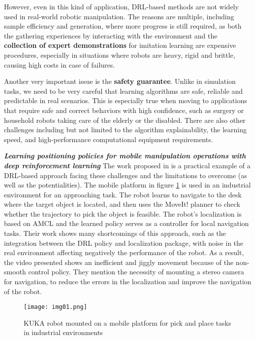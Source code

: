 However, even in this kind of application, DRL-based methods are not widely
used in real-world robotic manipulation. The reasons are multiple, including sample efficiency and generation,
where more progress is still required, as both the gathering experiences by interacting with
the environment and the \textbf{collection of expert demonstrations} for imitation learning are expensive
procedures, especially in situations where robots are heavy, rigid and brittle, causing high costs in case of failures.

Another very important issue is the \textbf{safety guarantee}.
Unlike in simulation tasks, we need to be very careful that learning
algorithms are safe, reliable and predictable in real scenarios. This is especially true
when moving to applications that require safe and correct behaviors with high confidence, such as
surgery or household robots taking care of the elderly or the disabled. There are also other
challenges including but not limited to the algorithm explainability, the learning speed,
and high-performance computational equipment requirements. \cite{liu2021deep}

\textbf{\textit{Learning positioning policies for mobile manipulation operations
		with deep reinforcement learning}}
\quad
The work proposed in \cite{iriondo2023learning} is a practical example of a DRL-based approach
facing these challenges and the limitations to overcome (as well as the potentialities).
The mobile platform in figure \ref{fig:img01} is used in an industrial environment for an
approaching task. The robot learns to navigate to the desk where the target object is located,
and then uses the MoveIt! planner to check whether the trajectory to pick the object is feasible.
The robot's localization is based on AMCL and the learned policy serves as a controller for
local navigation tasks. Their work shows many shortcomings of this approach, such as the
integration between the DRL policy and localization package, with noise in the
real environment affecting negatively the performance of the robot. As a result,
the video presented shows an inefficient and jiggly movement
because of the non-smooth control policy. They mention the necessity of mounting
a stereo camera for navigation, to reduce the errors in the localization and
improve the navigation of the robot.

\begin{figure}[t]
	\centering
	\texttt{[image: img01.png]}
	\captionsetup{width=0.6\linewidth}
	\caption{KUKA robot mounted on a mobile platform for pick and place tasks
		in industrial environments \cite{iriondo2023learning}}
	\label{fig:img01}
\end{figure}


